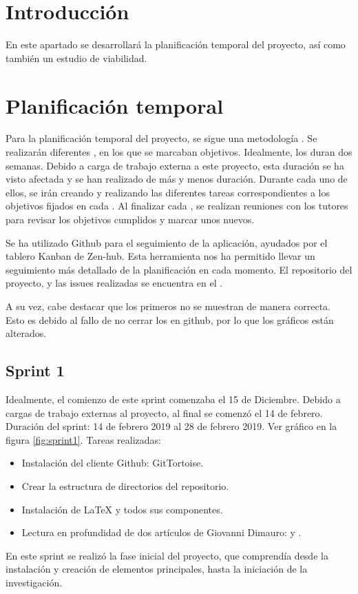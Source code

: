 
\section{Introducción}
En este apartado se desarrollará la planificación temporal del proyecto, así como también un estudio de viabilidad.

\section{Planificación temporal}
Para la planificación temporal del proyecto, se sigue una metodología . Se realizarán diferentes , en los que se marcaban objetivos. Idealmente, los  duran dos semanas. Debido a carga de trabajo externa a este proyecto, esta duración se ha visto afectada y se han realizado  de más y menos duración. Durante cada uno de ellos, se irán creando y realizando las diferentes tareas correspondientes a los objetivos fijados en cada . Al finalizar cada , se realizan reuniones con los tutores para revisar los objetivos cumplidos y marcar unos nuevos. 

Se ha utilizado Github para el seguimiento de la aplicación, ayudados por el tablero Kanban de Zen-hub. Esta herramienta nos ha permitido llevar un seguimiento más detallado de la planificación en cada momento. El repositorio del proyecto, y las issues realizadas se encuentra en el .

A su vez, cabe destacar que los primeros  no se muestran de manera correcta. Esto es debido al fallo de no cerrar los  en github, por lo que los gráficos  están alterados.

\subsection{Sprint 1}
Idealmente, el comienzo de este sprint comenzaba el 15 de Diciembre. Debido a cargas de trabajo externas al proyecto, al final se comenzó el 14 de febrero. Duración del sprint: 14 de febrero 2019 al 28 de febrero 2019. Ver gráfico  en la figura \ref{fig:sprint1}.
Tareas realizadas:
\begin{itemize}
\item Instalación del cliente Github: GitTortoise.
\item Crear la estructura de directorios del repositorio.
\item Instalación de \LaTeX{} y todos sus componentes. 
\item Lectura en profundidad de dos artículos de Giovanni Dimauro: \cite{giovanni1} y \cite{giovanni2} . 
\end{itemize}
En este sprint se realizó la fase inicial del proyecto, que comprendía desde la instalación y creación de elementos principales, hasta la iniciación de la investigación.


